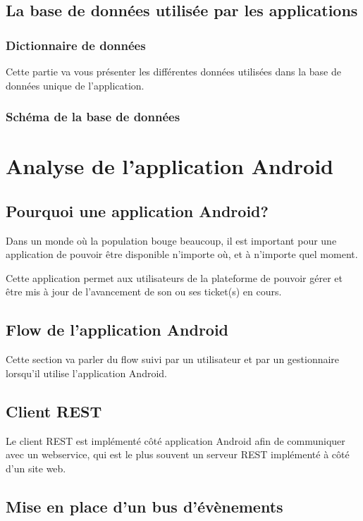 \documentclass[12pt,table,a4paper]{report}
\begin{document}
\subsection{La base de données utilisée par les applications}

\subsubsection{Dictionnaire de données}
Cette partie va vous présenter les différentes données utilisées dans la base de données unique de l'application.

\subsubsection{Schéma de la base de données}

\section{Analyse de l'application Android}

\subsection{Pourquoi une application Android?}
Dans un monde où la population bouge beaucoup, il est important pour une application de pouvoir être disponible n'importe où, et à n'importe quel moment.

Cette application permet aux utilisateurs de la plateforme de pouvoir gérer et être mis à jour de l'avancement de son ou ses ticket(s) en cours.

\subsection{Flow de l'application Android}
Cette section va parler du flow suivi par un utilisateur et par un gestionnaire lorsqu'il utilise l'application Android.

\subsection{Client REST}
Le client REST est implémenté côté application Android afin de communiquer avec un webservice, qui est le plus souvent un serveur REST implémenté à côté d'un site web.

\subsection{Mise en place d'un bus d'évènements}
\end{document}
